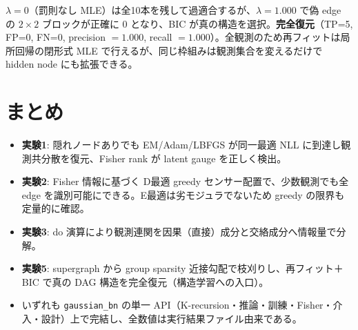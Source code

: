 \documentclass[a4paper,11pt]{ltjsarticle}
\begin{document}
$\lambda=0$（罰則なし MLE）は全10本を残して過適合するが、$\lambda=1.000$ で偽 edge の $2\times2$ ブロックが正確に $0$ となり、BIC が真の構造を選択。\textbf{完全復元}（TP=5, FP=0, FN=0, precision $=1.000$, recall $=1.000$）。全観測のため再フィットは局所回帰の閉形式 MLE で行えるが、同じ枠組みは観測集合を変えるだけで hidden node にも拡張できる。
\section{まとめ}
\begin{itemize}
\item \textbf{実験1}: 隠れノードありでも EM/Adam/LBFGS が同一最適 NLL に到達し観測共分散を復元、Fisher rank が latent gauge を正しく検出。
\item \textbf{実験2}: Fisher 情報に基づく D最適 greedy センサー配置で、少数観測でも全 edge を識別可能にできる。E最適は劣モジュラでないため greedy の限界も定量的に確認。
\item \textbf{実験3}: do 演算により観測連関を因果（直接）成分と交絡成分へ情報量で分解。
\item \textbf{実験5}: supergraph から group sparsity 近接勾配で枝刈りし、再フィット＋BIC で真の DAG 構造を完全復元（構造学習への入口）。
\item いずれも \texttt{gaussian\_bn} の単一 API（K-recursion・推論・訓練・Fisher・介入・設計）上で完結し、全数値は実行結果ファイル由来である。
\end{itemize}
\end{document}
